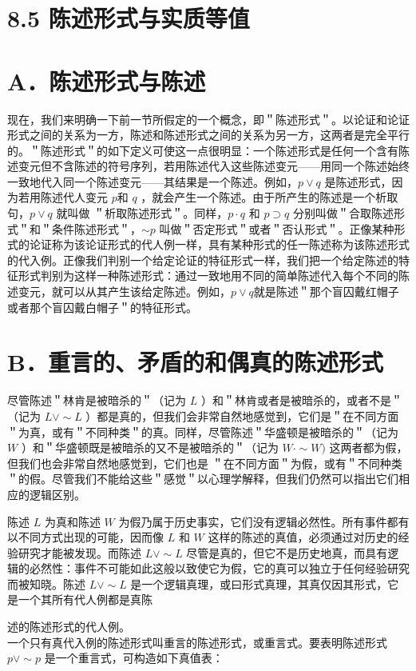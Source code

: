 \section*{8.5 陈述形式与实质等值}
\section*{A．陈述形式与陈述}
现在，我们来明确一下前一节所假定的一个概念，即＂陈述形式＂。以论证和论证形式之间的关系为一方，陈述和陈述形式之间的关系为另一方，这两者是完全平行的。＂陈述形式＂的如下定义可使这一点很明显：一个陈述形式是任何一个含有陈述变元但不含陈述的符号序列，若用陈述代入这些陈述变元——用同一个陈述始终一致地代入同一个陈述变元——其结果是一个陈述。例如，$p \vee q$ 是陈述形式，因为若用陈述代人变元 $p$和 $q$ ，就会产生一个陈述。由于所产生的陈述是一个析取句，$p \vee q$ 就叫做 ＂析取陈述形式＂。同样，$p \cdot q$ 和 $p \supset q$ 分别叫做＂合取陈述形式＂和＂条件陈述形式＂，$\sim p$ 叫做＂否定形式＂或者＂否认形式＂。正像某种形式的论证称为该论证形式的代人例一样，具有某种形式的任一陈述称为该陈述形式的代入例。正像我们判别一个给定论证的特征形式一样，我们把一个给定陈述的特征形式判别为这样一种陈述形式：通过一致地用不同的简单陈述代入每个不同的陈述变元，就可以从其产生该给定陈述。例如，$p \vee q$就是陈述＂那个盲囚戴红帽子或者那个盲囚戴白帽子＂的特征形式。

\section*{B．重言的、矛盾的和偶真的陈述形式}
尽管陈述＂林肯是被暗杀的＂（记为 $L$ ）和＂林肯或者是被暗杀的，或者不是＂（记为 $L \vee \sim L$ ）都是真的，但我们会非常自然地感觉到，它们是＂在不同方面＂为真，或有＂不同种类＂的真。同样，尽管陈述＂华盛顿是被暗杀的＂（记为 $W$ ）和＂华盛顿既是被暗杀的又不是被暗杀的＂（记为 $W \cdot \sim W)$ 这两者都为假，但我们也会非常自然地感觉到，它们也是 ＂在不同方面＂为假，或有＂不同种类＂的假。尽管我们不能给这些＂感觉＂以心理学解释，但我们仍然可以指出它们相应的逻辑区别。

陈述 $L$ 为真和陈述 $W$ 为假乃属于历史事实，它们没有逻辑必然性。所有事件都有以不同方式出现的可能，因而像 $L$ 和 $W$ 这样的陈述的真值，必须通过对历史的经验研究才能被发现。而陈述 $L \vee \sim L$ 尽管是真的，但它不是历史地真，而具有逻辑的必然性：事件不可能如此这般以致使它为假，它的真可以独立于任何经验研究而被知晓。陈述 $L \vee \sim L$ 是一个逻辑真理，或曰形式真理，其真仅因其形式，它是一个其所有代人例都是真陈

述的陈述形式的代人例。\\
一个只有真代入例的陈述形式叫重言的陈述形式，或重言式。要表明陈述形式 $p \vee \sim p$ 是一个重言式，可构造如下真值表：

